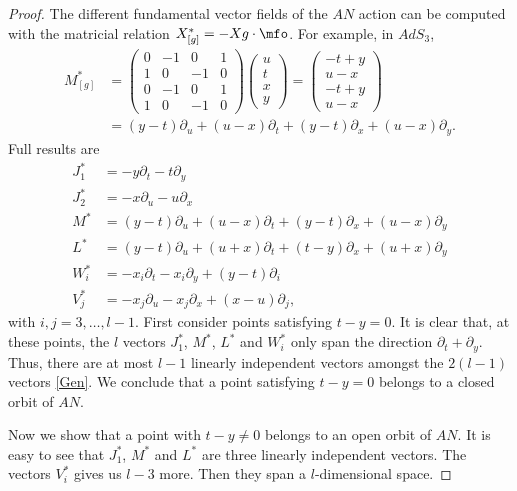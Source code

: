 \begin{proof}
The different fundamental vector fields of the $AN$ action can be computed with the matricial relation $X^*_{[g]}=-Xg\cdot\mfo$. For example, in $AdS_3$,
\[
\begin{split}
   M^*_{[g]}&=
\begin{pmatrix}
0&-1&0&1\\
1&0&-1&0\\
0&-1&0&1\\
1&0&-1&0
\end{pmatrix}
\begin{pmatrix}
u\\t\\x\\y
\end{pmatrix}
=
\begin{pmatrix}
-t+y\\u-x\\-t+y\\u-x
\end{pmatrix}\\
&=(y-t)\partial_u+(u-x)\partial_t+(y-t)\partial_x+(u-x)\partial_y.
\end{split}
\]
Full results are
\begin{subequations}\label{Gen}
\begin{align}
J_1^*&=-y\partial_t-t\partial_y							\label{EqNormeJun}\\
J_2^*&=-x\partial_u-u\partial_x                                                      \label{eq:Jds}\\
M^*  &=(y-t)\partial_u+(u-x)\partial_t+(y-t)\partial_x+(u-x)\partial_y\\
L^*  &=(y-t)\partial_u+(u+x)\partial_t+(t-y)\partial_x+(u+x)\partial_y\\
W_i^*&=-x_i\partial_t-x_i\partial_y+(y-t)\partial_i\\
V_j^*&=-x_j\partial_u-x_j\partial_x+(x-u)\partial_j,
\label{eq:Vjs}
\end{align}
\end{subequations}
with $i,j=3,\ldots,l-1$.
First consider points satisfying $t-y=0$. It is clear that, at these points, the $l$ vectors $J_1^*$, $M^*$, $L^*$ and $W_i^*$ only span the direction $\partial_t+\partial_y$. Thus, there are at most $l-1$ linearly independent vectors amongst the $2(l-1)$ vectors \eqref{Gen}. We conclude that a point satisfying $t-y=0$ belongs to a closed orbit of $AN$.

Now we show that a point with $t-y\neq 0$ belongs to an open orbit of $AN$. It is easy to see that $J_1^*$, $M^*$ and $L^*$ are three linearly independent vectors. The vectors $V_i^*$ gives us $l-3$ more. Then they span a $l$-dimensional space.


\end{proof}
